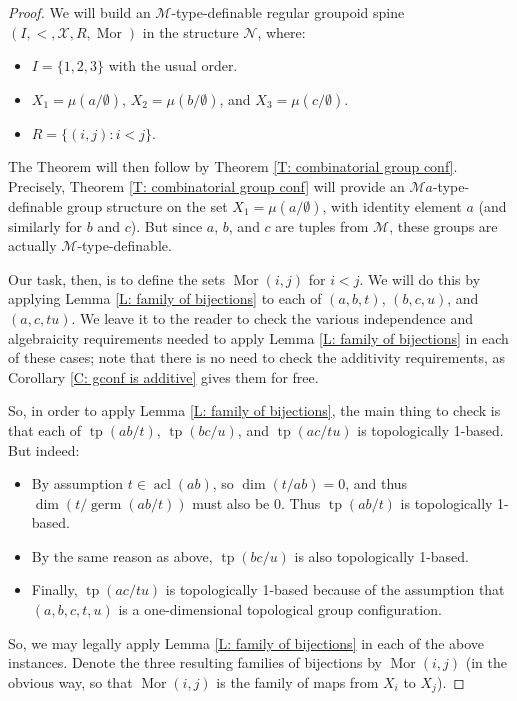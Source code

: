 \documentclass{amsart}
\theoremstyle{definition}
\newcommand{\acl}{\operatorname{acl}}
\newcommand{\tp}{\operatorname{tp}}
\begin{document}
    \begin{proof}
        We will build an $\mathcal M$-type-definable regular groupoid spine $(I,<,\mathcal X,R,\operatorname{Mor})$ in the structure $\mathcal N$, where:
        \begin{itemize}
            \item $I=\{1,2,3\}$ with the usual order.
            \item $X_1=\mu(a/\emptyset)$, $X_2=\mu(b/\emptyset)$, and $X_3=\mu(c/\emptyset)$.
            \item $R=\{(i,j):i<j\}$.
        \end{itemize}
        The Theorem will then follow by Theorem \ref{T: combinatorial group conf}. Precisely, Theorem \ref{T: combinatorial group conf} will provide an $\mathcal Ma$-type-definable group structure on the set $X_1=\mu(a/\emptyset)$, with identity element $a$ (and similarly for $b$ and $c$). But since $a$, $b$, and $c$ are tuples from $\mathcal M$, these groups are actually $\mathcal M$-type-definable. 

        Our task, then, is to define the sets $\operatorname{Mor}(i,j)$ for $i<j$. We will do this by applying Lemma \ref{L: family of bijections} to each of $(a,b,t)$, $(b,c,u)$, and $(a,c,tu)$. We leave it to the reader to check the various independence and algebraicity requirements needed to apply Lemma \ref{L: family of bijections} in each of these cases; note that there is no need to check the additivity requirements, as Corollary \ref{C: gconf is additive}  gives them for free.

        So, in order to apply Lemma \ref{L: family of bijections}, the main thing to check is that each of $\tp(ab/t)$, $\tp(bc/u)$, and $\tp(ac/tu)$ is topologically 1-based. But indeed:
        
        \begin{itemize}
            \item By assumption $t\in\acl(ab)$, so $\dim(t/ab)=0$, and thus $\dim(t/\operatorname{germ}(ab/t))$ must also be 0. Thus $\tp(ab/t)$ is topologically 1-based.
            \item By the same reason as above, $\tp(bc/u)$ is also topologically 1-based.
            \item Finally, $\tp(ac/tu)$ is topologically 1-based because of the assumption that $(a,b,c,t,u)$ is a one-dimensional topological group configuration.
        \end{itemize}
        
        So, we may legally apply Lemma \ref{L: family of bijections} in each of the above instances. Denote the three resulting families of bijections by $\operatorname{Mor}(i,j)$ (in the obvious way, so that $\operatorname{Mor}(i,j)$ is the family of maps from $X_i$ to $X_j$).
        

\end{proof}
\end{document}
